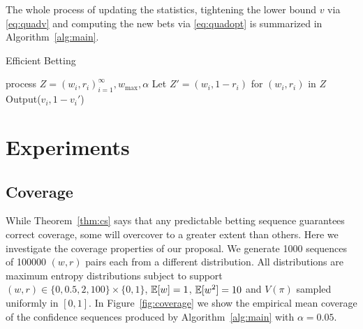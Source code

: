 The whole process of updating the statistics,
tightening the lower bound $v$ via \eqref{eq:quadv}
and computing the new bets via \eqref{eq:quadopt}
is summarized in Algorithm~\ref{alg:main}.

\begin{algorithm}[tb]
   \caption{Efficient Betting}
   \label{alg:main}
\begin{algorithmic}
     process $Z=(w_i,r_i)_{i=1}^\infty, w_{\max}, \alpha$
    \STATE Let $Z' = (w_i,1-r_i)$ for $(w_i,r_i)$ in $Z$
        \STATE Output($v_i,1-v_i'$)
   \ENDFOR
{}
\ENDFUNCTION
\end{algorithmic}
\end{algorithm}

\section{Experiments}

\subsection{Coverage} \label{sec:coverage}
While Theorem~\ref{thm:cs} says that any predictable betting sequence
guarantees correct coverage, some will overcover to a greater extent than others. Here we investigate the coverage properties of our 
proposal. We generate 1000 sequences of 100000 $(w,r)$ pairs 
each from a different distribution. All distributions are 
maximum entropy distributions subject to
support $(w,r) \in \{0, 0.5, 2, 100\} \times \{0,1\}$,
$\mathbb{E}[w]=1$, $\mathbb{E}[w^2]=10$ and $V(\pi)$ sampled uniformly 
in $[0,1]$. In Figure~\ref{fig:coverage} we show the 
empirical mean coverage of the confidence sequences produced 
by Algorithm~\ref{alg:main} with $\alpha=0.05$. 


